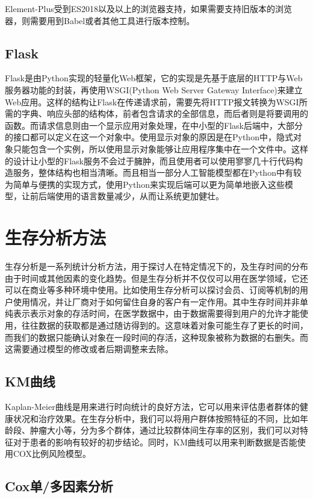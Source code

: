 Element-Plus受到ES2018以及以上的浏览器支持，如果需要支持旧版本的浏览器，则需要用到Babel或者其他工具进行版本控制。

\subsection{Flask}

Flask是由Python实现的轻量化Web框架，它的实现是先基于底层的HTTP与Web服务器功能的封装，再使用WSGI(Python Web Server Gateway Interface)来建立Web应用。这样的结构让Flask在传递请求前，需要先将HTTP报文转换为WSGI所需的字典、响应头部的结构体，前者包含请求的全部信息，而后者则是将要调用的函数。而请求信息则由一个显示应用对象处理，在中小型的Flask后端中，大部分的接口都可以定义在这一个对象中。使用显示对象的原因是在Python中，隐式对象只能包含一个实例，所以使用显示对象能够让应用程序集中在一个文件中。这样的设计让小型的Flask服务不会过于臃肿，而且使用者可以使用寥寥几十行代码构造服务，整体结构也相当清晰。而且相当一部分人工智能模型都在Python中有较为简单与便携的实现方式，使用Python来实现后端可以更为简单地嵌入这些模型，让前后端使用的语言数量减少，从而让系统更加健壮。

\section{生存分析方法}

生存分析是一系列统计分析方法，用于探讨人在特定情况下的，及生存时间的分布由于时间或其他因素的变化趋势。但是生存分析并不仅仅可以用在医学领域，它还可以在商业等多种环境中使用。比如使用生存分析可以探讨会员、订阅等机制的用户使用情况，并让厂商对于如何留住自身的客户有一定作用。其中生存时间并非单纯表示表示对象的存活时间，在医学数据中，由于数据需要得到用户的允许才能使用，往往数据的获取都是通过随访得到的。这意味着对象可能生存了更长的时间，而我们的数据只能确认对象在一段时间的存活，这种现象被称为数据的右删失。而这需要通过模型的修改或者后期调整来去除。

\subsection{KM曲线}

Kaplan-Meier曲线是用来进行时向统计的良好方法，它可以用来评估患者群体的健康状况和治疗效果。在生存分析中，我们可以将用户群体按照特征的不同，比如年龄段、肿瘤大小等，分为多个群体，通过比较群体间生存率的区别，我们可以对特征对于患者的影响有较好的初步结论。同时，KM曲线可以用来判断数据是否能使用COX比例风险模型。

\subsection{Cox单/多因素分析}


